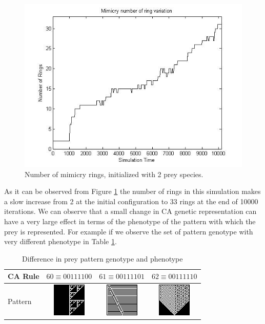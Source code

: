 \begin{figure}[H]
	\centering
	\includegraphics[scale=0.50]{images/ringSize10k-2Prey}
	\caption{Number of mimicry rings, initialized with 2 prey species.}
	\label{fig:ringSize10k-2Prey}
\end{figure}

As it can be observed from Figure \ref{fig:ringSize10k-2Prey} the number of rings in this simulation makes a slow increase from 2 at the initial configuration to 33 rings at the end of 10000 iterations. We can observe that a small change in CA genetic representation can have a very large effect in terms of the phenotype of the pattern with which the prey is represented. For example if we observe the set of pattern genotype with very different phenotype in Table \ref{tab:diff-in-pattern}.

\begin{table}[H]
\centering
\begin{tabular}{|l|c|c|c|}
  \hline
  CA Rule & \(60 \equiv 00111100\) & \(61 \equiv 00111101\) & \(62 \equiv 00111110 \) \\ \hline
  Pattern & \parbox[c]{2.1em}{\includegraphics[scale=0.50]{images/CARule60}} 
  				& \parbox[c]{2.1em}{\includegraphics[scale=0.50]{images/CARule61}} 
  				& \parbox[c]{2.1em}{\includegraphics[scale=0.50]{images/CARule62}}\\
  \hline
\end{tabular}
\caption{Difference in prey pattern genotype and phenotype}
\label{tab:diff-in-pattern}
\end{table}

